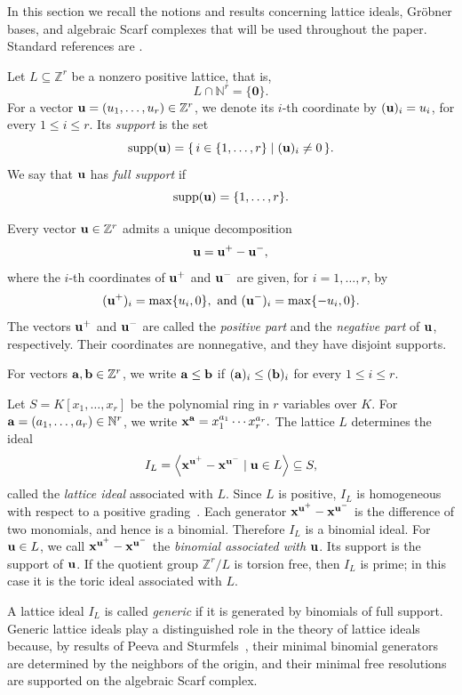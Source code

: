 \documentclass[12pt,a4paper]{amsart}
\theoremstyle{definition}
\begin{document}
In this section we recall the notions and results concerning lattice
ideals, Gr\"obner bases, and algebraic Scarf complexes that will be
used throughout the paper. Standard references are
\cite{CLO,MS,PS,Stu}.

Let $L\subseteq\mathbb Z^{r}$ be a nonzero positive lattice, that is,
\[
L\cap\mathbb N^{r}=\{\mathbf 0\}.
\] For a vector
${\bf u}=(u_1,\ldots,u_r)\in\mathbb Z^{r}$,
we denote its $i$-th coordinate by
$({\bf u})_i=u_i$, for every $1\le i\leq r$.
Its \emph{support} is the set
\[
\operatorname{supp}({\bf u})
=
\{\,i\in\{1,\ldots,r\}\mid({\bf u})_i\neq0\,\}.
\]
We say that ${\bf u}$ has \emph{full support} if
\[
\operatorname{supp}({\bf u})=\{1,\ldots,r\}.
\]

Every vector ${\bf u}\in\mathbb Z^{r}$ admits a unique decomposition
\[
{\bf u}={\bf u}^{+}-{\bf u}^{-},
\]
where the $i$-th coordinates of ${\bf u}^{+}$ and ${\bf u}^{-}$ are
given, for $i=1,\ldots,r$, by
\[
({\bf u}^{+})_i=\max\{u_i,0\},\ \textrm{and} \
({\bf u}^{-})_i=\max\{-u_i,0\}.
\]
The vectors ${\bf u}^{+}$ and ${\bf u}^{-}$ are called the
\emph{positive part} and the \emph{negative part} of ${\bf u}$,
respectively. Their coordinates are nonnegative, and they have
disjoint supports.

For vectors ${\bf a},{\bf b}\in\mathbb Z^{r}$, we write
$
{\bf a}\le{\bf b}$
if
$
({\bf a})_i\le({\bf b})_i$ for every $1 \leq i \leq r.$

Let $S=K[x_1,\ldots,x_r]$
be the polynomial ring in $r$ variables over $K$.
For
${\bf a}=(a_1,\ldots,a_r)\in\mathbb N^{r}$,
we write
$
{\bf x}^{\bf a}=x_1^{a_1} \cdots x_r^{a_r}.$ The lattice $L$ determines the ideal
\[
I_L=
\left\langle
{\bf x}^{{\bf u}^{+}}-{\bf x}^{{\bf u}^{-}}
\mid
{\bf u}\in L
\right\rangle
\subseteq S,
\]
called the \emph{lattice ideal} associated with $L$.
Since $L$ is positive, $I_L$ is homogeneous with respect to a positive
grading~\cite{PS}. Each generator
$
{\bf x}^{{\bf u}^{+}}-{\bf x}^{{\bf u}^{-}}
$
is the difference of two monomials, and hence is a binomial.
Therefore $I_L$ is a binomial ideal.
For ${\bf u}\in L$, we call
$
{\bf x}^{{\bf u}^{+}}-{\bf x}^{{\bf u}^{-}}
$
the \emph{binomial associated with} ${\bf u}$.
Its support is the support of ${\bf u}$.
If the quotient group
$\mathbb Z^{r}/L$
is torsion free, then $I_L$ is prime; in this case it is the toric
ideal associated with $L$.

A lattice ideal $I_L$ is called \emph{generic} if it is generated by
binomials of full support. Generic lattice ideals play a distinguished role in the theory of
lattice ideals because, by results of Peeva and
Sturmfels~\cite{PS}, their minimal binomial generators are determined
by the neighbors of the origin, and their minimal free resolutions are
supported on the algebraic Scarf complex.
\end{document}
